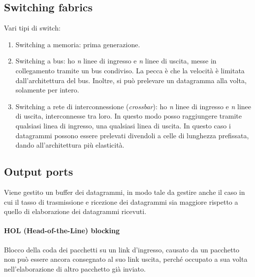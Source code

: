 \subsection{Switching fabrics}
Vari tipi di switch:
\begin{enumerate}
	\item Switching a memoria: prima generazione. 
	\item Switching a bus: ho \textit{n} linee di ingresso e \textit{n} linee di uscita, messe in collegamento tramite un bus condiviso. La pecca è che la velocità è limitata dall'architettura del bus. Inoltre, si può prelevare un datagramma alla volta, solamente per intero.
	\item Switching a rete di interconnessione (\textit{crossbar}): ho \textit{n} linee di ingresso e \textit{n} linee di uscita, interconnesse tra loro. In questo modo posso raggiungere tramite qualsiasi linea di ingresso, una qualsiasi linea di uscita. In questo caso i datagrammi possono essere prelevati divendoli a celle di lunghezza prefissata, dando all'architettura più elasticità.
\end{enumerate}
\subsection{Output ports}
Viene gestito un buffer dei datagrammi, in modo tale da gestire anche il caso in cui il tasso di trasmissione e ricezione dei datagrammi sia maggiore rispetto a quello di elaborazione dei datagrammi ricevuti.
\paragraph{HOL (Head-of-the-Line) blocking}
Blocco della coda dei pacchetti su un link d'ingresso, causato da un pacchetto non può essere ancora consegnato al suo link uscita, perché occupato a sua volta nell'elaborazione di altro pacchetto già inviato.

